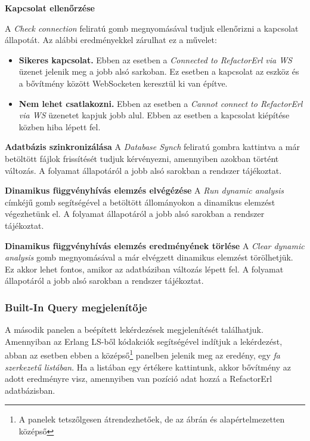 \vspace{5mm}
\noindent \textbf{Kapcsolat ellenőrzése}

A \textit{Check connection} feliratú gomb megnyomásával tudjuk ellenőrizni a kapcsolat állapotát. Az alábbi eredményekkel zárulhat ez a művelet:

\begin{itemize}
    \item \textbf{Sikeres kapcsolat.} Ebben az esetben a \textit{Connected to RefactorErl via WS} üzenet jelenik meg a jobb alsó sarkoban. Ez esetben a kapcsolat az eszköz és a bővítmény között WebSocketen keresztül ki van építve.
    \item \textbf{Nem lehet csatlakozni.} Ebben az esetben a \textit{Cannot connect to RefactorErl via WS} üzenetet kapjuk jobb alul. Ebben az esetben a kapcsolat kiépítése közben hiba lépett fel.
\end{itemize}

\vspace{5mm}
\noindent \textbf{Adatbázis szinkronizálása} 
A \textit{Database Synch} feliratú gombra kattintva a már betöltött fájlok frissítését tudjuk kérvényezni, amennyiben azokban történt változás. A folyamat állapotáról a jobb alsó sarokban a rendszer tájékoztat.

\vspace{5mm}
\noindent \textbf{Dinamikus függvényhívás elemzés elvégézése}
A \textit{Run dynamic analysis} címkéjű gomb segítségével a betöltött állományokon a dinamikus elemzést végezhetünk el. A folyamat állapotáról a jobb alsó sarokban a rendszer tájékoztat.

\vspace{5mm}
\noindent \textbf{Dinamikus függvényhívás elemzés eredményének törlése}
A \textit{Clear dynamic analysis} gomb megnyomásával a már elvégzett dinamikus elemzést törölhetjük. Ez akkor lehet fontos, amikor az adatbáziban változás lépett fel. A folyamat állapotáról a jobb alsó sarokban a rendszer tájékoztat.


\subsubsection{Built-In Query megjelenítője} \label{sectionVariable}

A második panelen a beépített lekérdezések megjelenítését találhatjuk. Amennyiban az Erlang LS-ből kódakciók segítségével indítjuk a lekérdezést, abban az esetben ebben a középső\footnote{A panelek tetszőlgesen átrendezhetőek, de az ábrán és alapértelmezetten középső} panelben jelenik meg az eredény, egy \textit{fa szerkezetű listában}. Ha a listában egy értékere kattintunk, akkor bővítmény az adott eredményre visz, amennyiben van pozíció adat hozzá a RefactorErl adatbázisban.

